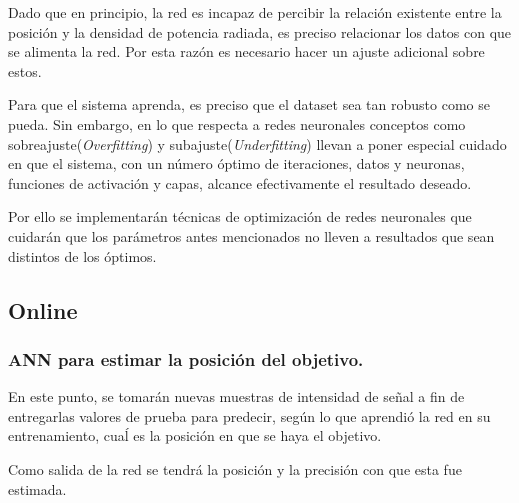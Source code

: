 Dado que en principio, la red es incapaz de percibir la relación existente entre la posición y la densidad de potencia radiada, es preciso relacionar los datos con que se alimenta la red. Por esta razón es necesario hacer un ajuste adicional sobre estos.

Para que el sistema aprenda, es preciso que el dataset sea tan robusto como se pueda. Sin embargo, en lo que respecta a redes neuronales conceptos como  sobreajuste(\textit{\glsenablehyper\gls{Overfitting}}) y  subajuste(\textit{\glsenablehyper\gls{Underfitting}}) llevan a poner especial cuidado en que el sistema, con un número óptimo de iteraciones, datos y neuronas, funciones de activación y capas, alcance efectivamente el resultado deseado.

Por ello se implementarán técnicas de optimización de redes neuronales que cuidarán que los parámetros antes mencionados no lleven a resultados que sean distintos de los óptimos.

\subsection{Online}

\subsubsection{ANN para estimar la posición del objetivo.}

En este punto, se tomarán nuevas muestras de intensidad de señal a fin de entregarlas valores de prueba para predecir, según lo que aprendió la red en su entrenamiento, cuaĺ es la posición en que se haya el objetivo.

Como salida de la red se tendrá la posición y la precisión con que esta fue estimada.
